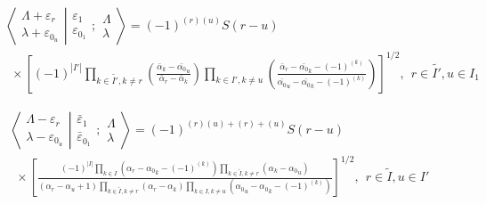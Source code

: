 \documentclass[12pt]{article}
\def\nn{\nonumber}
\begin{document}
\begin{align}
& \left\langle\left. 
\begin{array}{c} \Lambda+\varepsilon_r\\ \lambda+\varepsilon_{0_u} 
 \end{array}
\right|\right.
\left.
\begin{array}{c} \varepsilon_1 \\ \varepsilon_{0_1} 
 \end{array}
; \begin{array}{c} \Lambda \\ \lambda
 \end{array}
\right\rangle = (-1)^{(r)(u)} S(r-u) \nn\\
&~~\times \left[ (-1)^{|I'|} \prod_{k\in \tilde{I'},k\neq r} 
\left(
\frac 
{\bar{\alpha}_k - \bar{\alpha_0}_u  }
{\bar{\alpha}_r - \bar{\alpha}_k }
\right)
\prod_{k\in I',k \neq u} 
\left(
\frac
{ \bar{\alpha}_r - \bar{\alpha_0}_k - (-1)^{(k)} }
{\bar{\alpha_0}_u - \bar{\alpha_0}_k - (-1)^{(k)} }
\right)
\right]^{1/2}
,\ \ r\in \tilde{I'},u\in I_1 \label{FinalBarredOdd}
\end{align}

\begin{align}
&\left\langle\left. 
\begin{array}{c} \Lambda-\varepsilon_r\\ \lambda-\varepsilon_{0_u} 
 \end{array}
\right|\right.
\left.
\begin{array}{c} \bar{\varepsilon}_1 \\ \bar{\varepsilon}_{0_1} 
 \end{array}
; \begin{array}{c} \Lambda \\ \lambda
 \end{array}
\right\rangle
= (-1)^{(r)(u) +(r) + (u)} S(r-u)
\nn \\
&~~\times
\left[
\frac{
(-1)^{|I|}
\prod_{k\in I} \left(\alpha_r - {\alpha_0}_k - (-1)^{(k)}\right)
\prod_{k\in\tilde{I},k \neq r} \left(\alpha_k - {\alpha_0}_u \right)
}
{
({\alpha}_r-{\alpha}_u + 1)
\prod_{k\in \tilde{I},k\neq r} \left(\alpha_r - \alpha_k \right)
\prod_{k\in I,k\neq u} \left({\alpha_0}_u - {\alpha_0}_k - (-1)^{(k)}\right)
} 
\right]^{1/2}
,\ \ r\in \tilde{I},u\in I' \label{FinalUnBarredEven}
\end{align}
\end{document}
